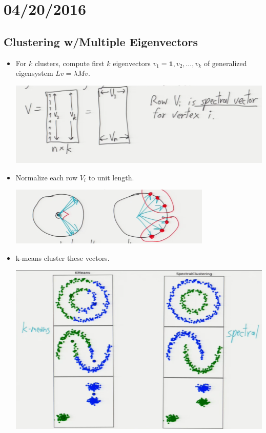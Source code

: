 \documentclass[10pt]{article}
\begin{document}
\section*{04/20/2016}
\subsection*{Clustering w/Multiple Eigenvectors}
\begin{itemize}
	\item For $k$ clusters, compute first $k$ eigenvectors $v_{1} = \textbf{1}, v_{2}, \dots, v_{k}$ of generalized eigensystem $Lv = \lambda Mv$.
		\begin{center}
			\includegraphics[scale=0.8]{../images/spectralspace}
		\end{center}
	\item Normalize each row $V_{i}$ to unit length.
		\begin{center}
			\includegraphics{../images/vectorclusters}
		\end{center}
	\item k-means cluster these vectors.
		\begin{center}
			\includegraphics[scale=0.8]{../images/spectralclustering}
		\end{center}
\end{itemize}
\end{document}
